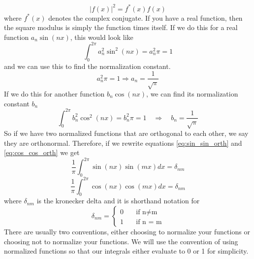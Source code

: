 \documentclass{article}
\newcommand{\be}{\begin{equation}}
\newcommand{\ee}{\end{equation}}
\begin{document}
\be
  |f(x)|^2 = f^*(x) f(x)
\ee
where $f^*(x)$ denotes the complex conjugate.
If you have a real function, then the square modulus is simply the function times itself.
If we do this for a real function $a_n \sin(nx)$, this would look like
\be \label{eq:sin_sin_norm_norm}
  \int_0^{2\pi} a_n^2 \sin^2(nx) = a_n^2\pi = 1
\ee
and we can use this to find the normalization constant.
\be
  a_n^2\pi = 1 \Rightarrow a_n = \frac{1}{\sqrt{\pi}}
\ee
If we do this for another function $b_n \cos(nx)$, we can find its normalization constant $b_n$
\be \label{eq:cos_cos_norm_norm}
  \int_0^{2\pi} b_n^2 \cos^2(nx) = b_n^2\pi = 1 \quad \Rightarrow \quad b_n = \frac{1}{\sqrt{\pi}}
\ee
So if we have two normalized functions that are orthogonal to each other, we say they are orthonormal.
Therefore, if we rewrite equations \ref{eq:sin_sin_orth} and \ref{eq:cos_cos_orth} we get
\be \label{eq:sin_sin_orthonorm}
  \frac{1}{\pi} \int_0^{2\pi} \sin(nx)\sin(mx) dx = \delta_{nm}
\ee
\be \label{eq:cos_cos_orthonorm}
  \frac{1}{\pi} \int_0^{2\pi} \cos(nx)\cos(mx) dx = \delta_{nm}
\ee
where $\delta_{nm}$ is the kronecker delta and it is shorthand notation for
\be
\delta_{nm} =
  \left\{
    \begin{array}{ll}
      0 & \quad \text{if n} \neq \text{m} \\
      1 & \quad \text{if n = m}
    \end{array}
  \right.
\ee
There are usually two conventions, either choosing to normalize your functions or choosing not to normalize your functions.
We will use the convention of using normalized functions so that our integrals either evaluate to 0 or 1 for simplicity.
\end{document}
